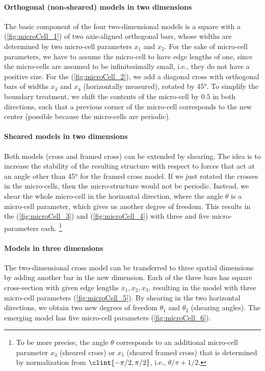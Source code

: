 \paragraph{Orthogonal (non-sheared) models in two dimensions}

The basic component of the four two-dimensional models
is a square with a  (\cref{fig:microCell_1})
of two axis-aligned orthogonal bars,
whose widths are determined by two micro-cell parameters $x_1$ and $x_2$.
For the sake of micro-cell parameters,
we have to assume the micro-cell to have edge lengths of one,
since the micro-cells are assumed to be infinitesimally small,
i.e., they do not have a positive size.
For the  (\cref{fig:microCell_2}),
we add a diagonal cross with orthogonal bars
of widths $x_3$ and $x_4$ (horizontally measured), rotated by \ang{45}.
To simplify the boundary treatment,
we shift the contents of the micro-cell by $0.5$ in both directions,
such that a previous corner of the micro-cell corresponds to the new center
(possible because the micro-cells are periodic).

\paragraph{Sheared models in two dimensions}

Both models (cross and framed cross) can be extended by shearing.
The idea is to increase the stability of the resulting structure
with respect to forces that act at an angle other than
\ang{45} for the framed cross model.
If we just rotated the crosses in the micro-cells,
then the micro-structure would not be periodic.
Instead, we shear the whole micro-cell in the horizontal direction,
where the angle $\theta$ is a micro-cell parameter,
which gives us another degree of freedom.
This results in the  (\cref{fig:microCell_3})
and  (\cref{fig:microCell_4})
with three and five micro-parameters each.%
\footnote{%
  To be more precise, the angle $\theta$ corresponds to an
  additional micro-cell parameter $x_3$ (sheared cross) or
  $x_5$ (sheared framed cross) that is determined by normalization
  from $\clint{-\pi/2, \pi/2}$, i.e., $\theta/\pi + 1/2$.%
}

\paragraph{Models in three dimensions}

The two-dimensional cross model can be transferred to three
spatial dimensions by adding another bar in the new dimension.
Each of the three bars has square cross-section with given edge lengths
$x_1, x_2, x_3$,
resulting in the  model with three micro-cell parameters
(\cref{fig:microCell_5}).
By shearing in the two horizontal directions,
we obtain two new degrees of freedom $\theta_1$ and $\theta_2$
(shearing angles).
The emerging  model has five micro-cell parameters
(\cref{fig:microCell_6}).



